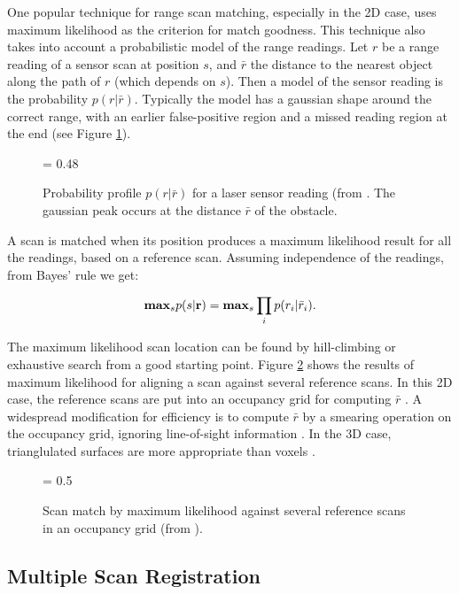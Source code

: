 \documentclass[twocolumn,oneside]{book}
\begin{document}
One popular technique for range scan matching, especially in the 2D
case, uses maximum likelihood as the criterion for match goodness.
This technique also takes into account a probabilistic model of the
range readings.  Let $r$ be a range reading of a sensor scan at
position $s$, and $\bar r$ the distance to the nearest object along
the path of $r$ (which depends on $s$).  Then a model of the sensor
reading is the probability $p(r|\bar r)$.  Typically the model has a
gaussian shape around the correct range, with an earlier
false-positive region and a missed reading region at the end (see Figure
\ref{prob.ch31}).  

\begin{figure}[htb]
{\epsfxsize = 0.48\textwidth {}}
\caption{Probability profile $p(r|\bar r)$ for a laser sensor reading
(from \cite{thrun05}.  The gaussian peak occurs at the distance $\bar
r$ of the obstacle. 
\label{prob.ch31}}
\end{figure}


A scan is matched when its position produces a maximum likelihood
result for all the readings, based on a reference scan.  Assuming
independence of the readings, from Bayes' rule we get:

$$ {\bf max}_s p(s | {\bf r}) = {\bf max}_s \prod_i p(r_i | \bar
r_i).$$

The maximum likelihood scan location can be found by hill-climbing or
exhaustive search from a good starting point.  Figure
\ref{scanmatch.ch31} shows the results of maximum likelihood for
aligning a scan against several reference scans.  In this 2D case, the
reference scans are put into an occupancy grid for computing $\bar r$
\cite{haehnel02b}.  A widespread modification for efficiency is to compute $\bar
r$ by a smearing operation on the occupancy grid, ignoring
line-of-sight information \cite{konolige99}.  In the 3D case, trianglulated
surfaces are more appropriate than voxels \cite{haehnel02}.

\begin{figure}[htb]
{\epsfxsize = 0.5\textwidth {}}
\caption{Scan match by maximum likelihood against several reference
scans in an occupancy grid (from \cite{haehnel02b}).
\label{scanmatch.ch31}}
\end{figure}

\subsection{Multiple Scan Registration}
\end{document}
